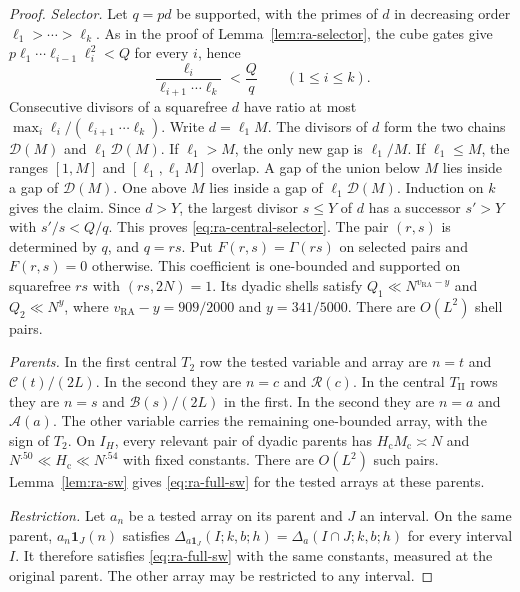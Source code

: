 \begin{proof}
\emph{Selector.} Let \(q=pd\) be supported, with the primes of \(d\) in
decreasing order \(\ell_1>\cdots>\ell_k\). As in the proof of
Lemma~\ref{lem:ra-selector}, the cube gates give
\(p\ell_1\cdots\ell_{i-1}\ell_i^2<Q\) for every \(i\), hence
\[
 \frac{\ell_i}{\ell_{i+1}\cdots\ell_k}<\frac Qq\qquad(1\le i\le k).
\]
Consecutive divisors of a squarefree \(d\) have ratio at most
\(\max_i\ell_i/(\ell_{i+1}\cdots\ell_k)\). Write \(d=\ell_1M\).
The divisors of \(d\) form the two chains \(\mathcal D(M)\) and
\(\ell_1\mathcal D(M)\). If \(\ell_1>M\), the only new gap is
\(\ell_1/M\). If \(\ell_1\le M\), the ranges \([1,M]\) and
\([\ell_1,\ell_1M]\) overlap. A gap of the union below \(M\) lies inside a
gap of \(\mathcal D(M)\).
One above \(M\) lies inside a gap of
\(\ell_1\mathcal D(M)\). Induction on \(k\) gives the claim. Since
\(d>Y\), the largest divisor \(s\le Y\) of \(d\) has a successor
\(s'>Y\) with \(s'/s<Q/q\).
This proves \eqref{eq:ra-central-selector}.
The pair \((r,s)\) is determined by \(q\), and \(q=rs\).
Put \(F(r,s)=\Gamma(rs)\) on selected pairs and \(F(r,s)=0\) otherwise.
This coefficient is
one-bounded and supported on squarefree \(rs\) with \((rs,2N)=1\). Its
dyadic shells satisfy \(Q_1\ll N^{v_{\mathrm{RA}}-y}\) and
\(Q_2\ll N^{y}\), where \(v_{\mathrm{RA}}-y=909/2000\) and
\(y=341/5000\).
There are \(O(L^2)\) shell pairs.

\emph{Parents.} In the first central \(T_2\) row the tested variable and
array are \(n=t\) and
\(\mathcal C(t)/(2L)\).
In the second they are \(n=c\) and
\(\mathcal R(c)\). In the central \(T_{\mathrm{II}}\) rows they are
\(n=s\) and \(\mathcal B(s)/(2L)\) in the first.
In the second they are \(n=a\) and \(\mathcal A(a)\). The other variable carries the remaining one-bounded array,
with the sign of \(T_2\). On \(I_H\), every relevant pair of dyadic parents
has \(H_{\mathrm c}M_{\mathrm c}\asymp N\) and
\(N^{.50}\ll H_{\mathrm c}\ll N^{.54}\) with fixed constants.
There are
\(O(L^2)\) such pairs. Lemma~\ref{lem:ra-sw} gives \eqref{eq:ra-full-sw}
for the tested arrays at these parents.

\emph{Restriction.} Let \(a_n\) be a tested array on its parent and \(J\)
an interval.
On the same parent, \(a_n\mathbf1_J(n)\) satisfies
\(\Delta_{a\mathbf1_J}(I;k,b;h)=\Delta_a(I\cap J;k,b;h)\) for every
interval \(I\). It therefore satisfies \eqref{eq:ra-full-sw} with the same
constants, measured at the original parent. The other array may be
restricted to any interval.


\end{proof}
